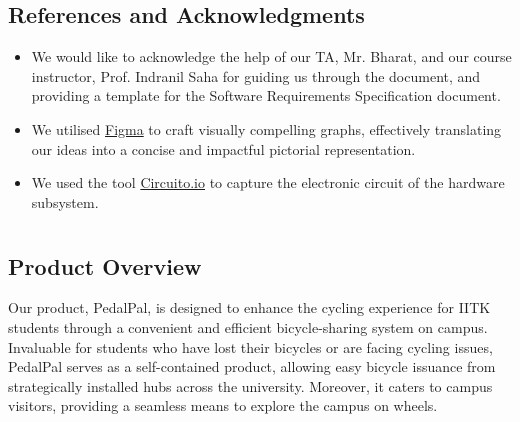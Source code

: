 \documentclass[11pt]{article}
\begin{document}
\subsection{References and Acknowledgments}
\begin{itemize}
    \item We would like to acknowledge the help of our TA, Mr. Bharat, and our course instructor, Prof. Indranil Saha for guiding us through the document, and providing a template for the Software Requirements Specification document.
    \item We utilised \href{https://www.figma.com/}{Figma} to craft visually compelling graphs, effectively translating our ideas into a concise and impactful pictorial representation.
    \item We used the tool \href{https://www.circuito.io/}{Circuito.io} to capture the electronic circuit of the hardware subsystem.
\end{itemize}

\newpage
\section{}
\subsection{Product Overview}
Our product, PedalPal, is designed to enhance the cycling experience for IITK students through a convenient and efficient bicycle-sharing system on campus. Invaluable for students who have lost their bicycles or are facing cycling issues, PedalPal serves as a self-contained product, allowing easy bicycle issuance from strategically installed hubs across the university. Moreover, it caters to campus visitors, providing a seamless means to explore the campus on wheels. 
\end{document}

